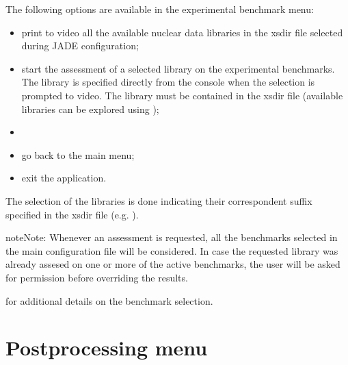 \documentclass[letterpaper,10pt,english]{sphinxmanual}
\let\sphinxpxdimen\pdfpxdimen\else\newdimen\sphinxpxdimen
\begin{document}
The following options are available in the experimental benchmark menu:
\begin{itemize}
\item {} 
 print to video all the available nuclear data libraries
in the xsdir file selected during JADE configuration;

\item {} 
 start the assessment of a selected library on the experimental benchmarks. The library is
specified directly from the console when the selection is prompted to
video. The library must be contained in the xsdir file (available libraries
can be explored using );

\item {} 
 

\item {} 
 go back to the main menu;

\item {} 
 exit the application.

\end{itemize}

The selection of the libraries is done indicating their correspondent suffix specified in the xsdir file
(e.g. ).

\begin{sphinxadmonition}{note}{Note:}
Whenever an assessment is requested, all the benchmarks selected in the main configuration file will be considered.
In case the requested library was already assesed on one or more of the active benchmarks,
the user will be asked for permission before overriding the results.
\end{sphinxadmonition}




{\hyperref[\detokenize{usage/configuration:config}]{}} for additional details on the benchmark selection.




\section{Post\sphinxhyphen{}processing menu}
\label{\detokenize{usage/menu:post-processing-menu}}\label{\detokenize{usage/menu:postmenu}}
\noindent\sphinxincludegraphics[width=400\sphinxpxdimen]{{postmenu}.png}
\end{document}
